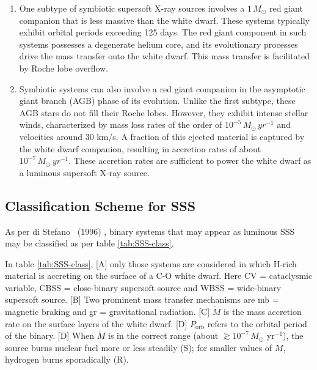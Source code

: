				\begin{enumerate}
					\item One subtype of symbiotic supersoft X-ray sources involves a $1\,M_{\odot}$ red giant companion that is less massive than the white dwarf. These systems typically exhibit orbital periods exceeding 125 days. The red giant component in such systems possesses a degenerate helium core, and its evolutionary processes drive the mass transfer onto the white dwarf. This mass transfer is facilitated by Roche lobe overflow.
					\item Symbiotic systems can also involve a red giant companion in the asymptotic giant branch (AGB) phase of its evolution. Unlike the first subtype, these AGB stars do not fill their Roche lobes. However, they exhibit intense stellar winds, characterized by mass loss rates of the order of $10^{-5}\,M_{\odot}\,yr^{-1}$ and velocities around 30 km/s. A fraction of this ejected material is captured by the white dwarf companion, resulting in accretion rates of about $10^{-7}\,M_{\odot}\,yr^{-1}$. These accretion rates are sufficient to power the white dwarf as a luminous supersoft X-ray source.
				\end{enumerate}
		
		\subsection{Classification Scheme for SSS} \label{introduction:current_status:sss-classification}
			As per di Stefano \etal\ (1996) \cite{distefano96}, binary systems that may appear as luminous SSS may be classified as per table \ref{tab:SSS-class}.
			
			In table \ref{tab:SSS-class}, [A] only those systems are considered in which H-rich material is accreting on the surface of a C-O white dwarf. Here CV = cataclysmic variable, CBSS = close-binary supersoft source and WBSS = wide-binary supersoft source. [B] Two prominent mass transfer mechanisms are mb = magnetic braking and gr = gravitational radiation. [C] $\dot{M}$ is the mass accretion rate on the surface layers of the white dwarf. [D] $P_\text{orb}$ refers to the orbital period of the binary. [D] When $\dot{M}$ is in the correct range (about $\gtrsim 10^{-7}\,M_{\odot}$ yr$^{-1}$), the source burns nuclear fuel more or less steadily (S); for smaller values of $\dot{M}$, hydrogen burns sporadically (R).
			
